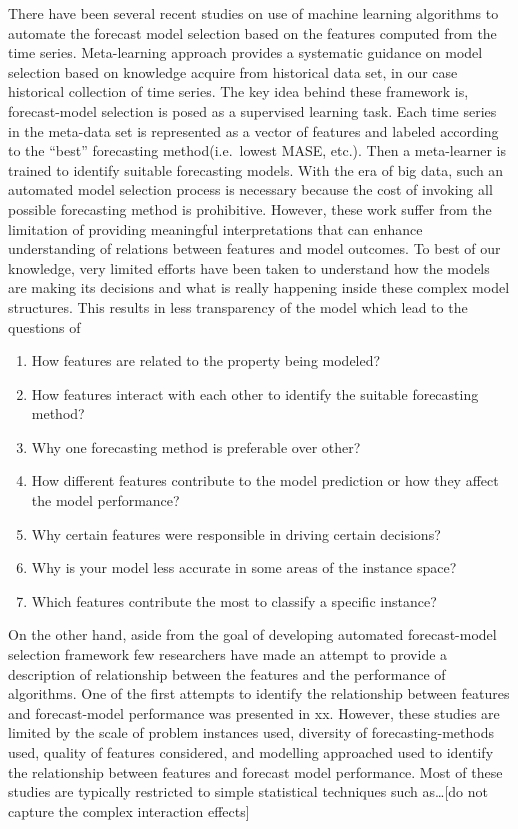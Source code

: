 \documentclass[11pt,a4paper,]{article}
\theoremstyle{definition}
\theoremstyle{definition}
\theoremstyle{definition}
\theoremstyle{remark}
\begin{document}
There have been several recent studies on use of machine learning
algorithms to automate the forecast model selection based on the
features computed from the time series. Meta-learning approach provides
a systematic guidance on model selection based on knowledge acquire from
historical data set, in our case historical collection of time series.
The key idea behind these framework is, forecast-model selection is
posed as a supervised learning task. Each time series in the meta-data
set is represented as a vector of features and labeled according to the
``best'' forecasting method(i.e.~lowest MASE, etc.). Then a meta-learner
is trained to identify suitable forecasting models. With the era of big
data, such an automated model selection process is necessary because the
cost of invoking all possible forecasting method is prohibitive.
However, these work suffer from the limitation of providing meaningful
interpretations that can enhance understanding of relations between
features and model outcomes. To best of our knowledge, very limited
efforts have been taken to understand how the models are making its
decisions and what is really happening inside these complex model
structures. This results in less transparency of the model which lead to
the questions of

\begin{enumerate}
\item How features are related to the property being modeled?
\item How features interact with each other to identify the suitable forecasting method?
\item Why one forecasting method is preferable over other? 
\item How different features contribute to the model prediction or how they affect the model performance?
\item Why certain features were responsible in driving certain decisions?
\item Why is your model less accurate in some areas of the instance space?
\item Which features contribute the most to classify a specific instance?
\end{enumerate}

On the other hand, aside from the goal of developing automated
forecast-model selection framework few researchers have made an attempt
to provide a description of relationship between the features and the
performance of algorithms. One of the first attempts to identify the
relationship between features and forecast-model performance was
presented in xx. However, these studies are limited by the scale of
problem instances used, diversity of forecasting-methods used, quality
of features considered, and modelling approached used to identify the
relationship between features and forecast model performance. Most of
these studies are typically restricted to simple statistical techniques
such as\ldots{}{[}do not capture the complex interaction effects{]}
\end{document}
